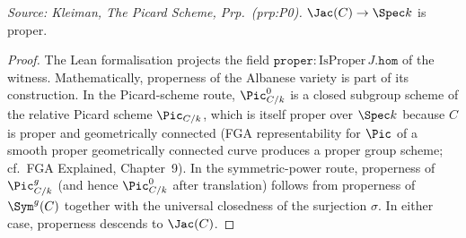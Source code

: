 \begin{theorem}\leanok
[Properness]
  \label{thm:Jacobian_proper}
  \textit{Source: Kleiman, The Picard Scheme, Prp.~(prp:P0).}
  \(\Jac(C) \to \Spec k\) is proper.
\end{theorem}
\begin{proof}

\leanok
  The Lean formalisation projects the field \(\mathtt{proper} : \mathrm{IsProper}\, J.\mathtt{hom}\) of the witness.
  Mathematically, properness of the Albanese variety is part of its construction. In the Picard-scheme route, \(\Pic^0_{C/k}\) is a closed subgroup scheme of the relative Picard scheme \(\Pic_{C/k}\), which is itself proper over \(\Spec k\) because \(C\) is proper and geometrically connected (FGA representability for \(\Pic\) of a smooth proper geometrically connected curve produces a proper group scheme; cf.\ FGA Explained, Chapter~9). In the symmetric-power route, properness of \(\Pic^g_{C/k}\) (and hence \(\Pic^0_{C/k}\) after translation) follows from properness of \(\Sym^g(C)\) together with the universal closedness of the surjection \(\sigma\). In either case, properness descends to \(\Jac(C)\).
\end{proof}
